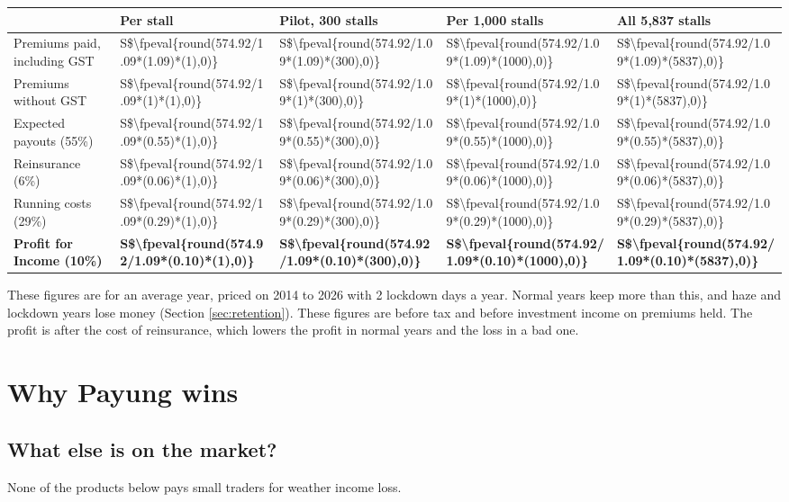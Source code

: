 \documentclass[11pt,a4paper]{article}
\newcommand{\head}{\rowcolor{soft}}
\newcommand{\sgd}{\textup{S\$}}
\def\bizPremium{574.92}
\newcommand{\biz}[2]{\sgd\num[group-separator={,},group-minimum-digits=4]{\fpeval{round(\bizPremium/1.09*(#1)*(#2),0)}}}
\begin{document}
\begin{center}
\small
\begin{tabularx}{\textwidth}{|Y|R{1.9cm}|R{2.3cm}|R{2.5cm}|R{2.6cm}|}
\hline
\head & \textbf{Per stall} & \textbf{Pilot, 300 stalls} & \textbf{Per 1,000 stalls} & \textbf{All 5,837 stalls} \\
\hline
Premiums paid, including GST & \biz{1.09}{1} & \biz{1.09}{300} & \biz{1.09}{1000} & \biz{1.09}{5837} \\
\hline
Premiums without GST & \biz{1}{1} & \biz{1}{300} & \biz{1}{1000} & \biz{1}{5837} \\
\hline
Expected payouts (55\%) & \biz{0.55}{1} & \biz{0.55}{300} & \biz{0.55}{1000} & \biz{0.55}{5837} \\
\hline
Reinsurance (6\%) & \biz{0.06}{1} & \biz{0.06}{300} & \biz{0.06}{1000} & \biz{0.06}{5837} \\
\hline
Running costs (29\%) & \biz{0.29}{1} & \biz{0.29}{300} & \biz{0.29}{1000} & \biz{0.29}{5837} \\
\hline
{}\textbf{Profit for Income (10\%)} & \textbf{\biz{0.10}{1}} & \textbf{\biz{0.10}{300}} & \textbf{\biz{0.10}{1000}} & \textbf{\biz{0.10}{5837}} \\
\hline
\end{tabularx}
\end{center}

These figures are for an average year, priced on 2014 to 2026 with 2 lockdown days a year. Normal years keep more than this, and haze and lockdown years lose money (Section \ref{sec:retention}). These figures are before tax and before investment income on premiums held. The profit is after the cost of reinsurance, which lowers the profit in normal years and the loss in a bad one.

\section{Why Payung wins}\label{sec:wins}

\subsection{What else is on the market?}\label{sec:compete}

None of the products below pays small traders for weather income loss.
\end{document}
